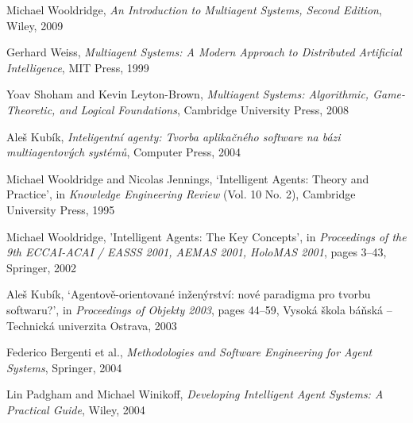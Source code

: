 \begin{thebibliography}{99}


Michael Wooldridge,
\textit{An Introduction to Multiagent Systems, Second Edition},
Wiley, 2009

Gerhard Weiss,
\textit{Multiagent Systems: A Modern Approach to Distributed Artificial Intelligence},
MIT Press, 1999

Yoav Shoham and Kevin Leyton-Brown,
\textit{Multiagent Systems: Algorithmic, Game-Theoretic, and Logical Foundations},
Cambridge University Press, 2008


Aleš Kubík,
\textit{Inteligentní agenty: Tvorba aplikačného software na bázi multiagentových systémů},
Computer Press, 2004

Michael Wooldridge and Nicolas Jennings,
`Intelligent Agents: Theory and Practice',
in \textit{Knowledge Engineering Review} (Vol. 10 No. 2),
Cambridge University Press, 1995

Michael Wooldridge,
'Intelligent Agents: The Key Concepts',
in \textit{Proceedings of the 9th ECCAI-ACAI / EASSS 2001, AEMAS 2001, HoloMAS 2001},
pages 3--43,
Springer, 2002 

Aleš Kubík,
`Agentově-orientované inženýrství: nové paradigma pro tvorbu softwaru?',
in \textit{Proceedings of Objekty 2003},
pages 44--59,
Vysoká škola báňská – Technická univerzita Ostrava, 2003


Federico Bergenti et al.,
\textit{Methodologies and Software Engineering for Agent Systems},
Springer, 2004

Lin Padgham and Michael Winikoff,
\textit{Developing Intelligent Agent Systems: A Practical Guide},
Wiley, 2004



\end{thebibliography}
